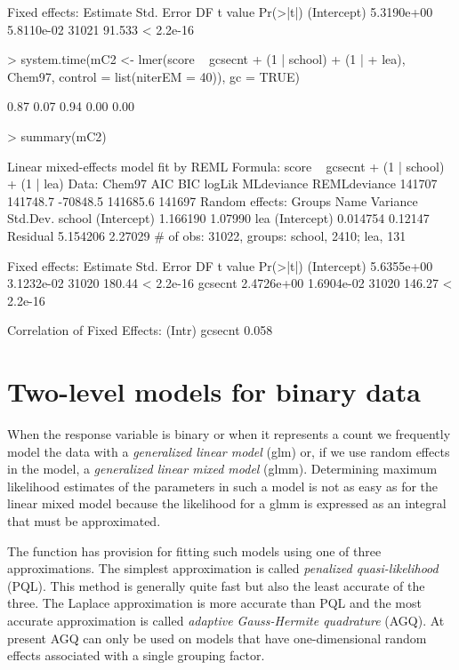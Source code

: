 \documentclass[12pt]{article}
\begin{document}
\begin{Schunk}
\begin{Soutput}
Fixed effects:
              Estimate Std. Error    DF t value  Pr(>|t|)
(Intercept) 5.3190e+00 5.8110e-02 31021  91.533 < 2.2e-16
\end{Soutput}
\begin{Sinput}
> system.time(mC2 <- lmer(score ~ gcsecnt + (1 | school) + (1 | 
+     lea), Chem97, control = list(niterEM = 40)), gc = TRUE)
\end{Sinput}
\begin{Soutput}
[1] 0.87 0.07 0.94 0.00 0.00
\end{Soutput}
\begin{Sinput}
> summary(mC2)
\end{Sinput}
\begin{Soutput}
Linear mixed-effects model fit by REML
Formula: score ~ gcsecnt + (1 | school) + (1 | lea) 
   Data: Chem97 
    AIC      BIC   logLik MLdeviance REMLdeviance
 141707 141748.7 -70848.5   141685.6       141697
Random effects:
 Groups   Name        Variance Std.Dev.
 school   (Intercept) 1.166190 1.07990 
 lea      (Intercept) 0.014754 0.12147 
 Residual             5.154206 2.27029 
# of obs: 31022, groups: school, 2410; lea, 131

Fixed effects:
              Estimate Std. Error    DF t value  Pr(>|t|)
(Intercept) 5.6355e+00 3.1232e-02 31020  180.44 < 2.2e-16
gcsecnt     2.4726e+00 1.6904e-02 31020  146.27 < 2.2e-16

Correlation of Fixed Effects:
        (Intr)
gcsecnt 0.058 
\end{Soutput}
\end{Schunk}


\section{Two-level models for binary data}
\label{sec:TwolevelBinary}

When the response variable is binary or when it represents a count we
frequently model the data with a \emph{generalized linear model} (glm)
or, if we use random effects in the model, a \emph{generalized linear
  mixed model} (glmm).  Determining maximum likelihood estimates of
the parameters in such a model is not as easy as for the linear mixed
model because the likelihood for a glmm is expressed as an integral
that must be approximated. 

The  function has provision for fitting such models using
one of three approximations.  The simplest approximation
is called \emph{penalized quasi-likelihood} (PQL). This method is
generally quite fast but also the least accurate of the three.  The
Laplace approximation is more accurate than PQL and the most accurate
approximation is called \emph{adaptive Gauss-Hermite quadrature}
(AGQ).  At present AGQ can only be used on models that have
one-dimensional random effects associated with a single
grouping factor.
\end{document}
